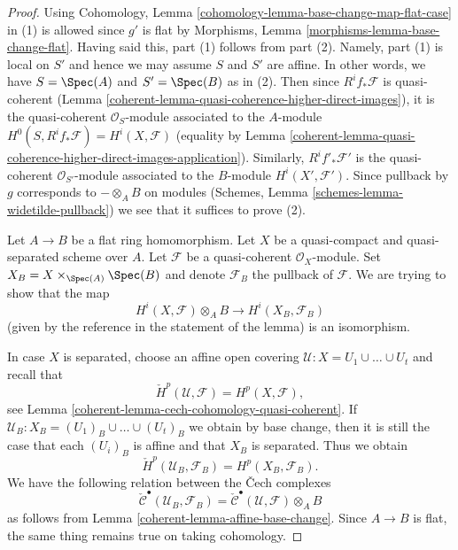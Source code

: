 \begin{proof}

Using Cohomology, Lemma \ref{cohomology-lemma-base-change-map-flat-case} in (1)
is allowed since $g'$ is flat by
Morphisms, Lemma \ref{morphisms-lemma-base-change-flat}.
Having said this, part (1) follows from part (2). Namely,
part (1) is local on $S'$ and hence we may assume $S$
and $S'$ are affine. In other words, we have $S = \Spec(A)$
and $S' = \Spec(B)$ as in (2).
Then since $R^if_*\mathcal{F}$ is quasi-coherent
(Lemma \ref{coherent-lemma-quasi-coherence-higher-direct-images}),
it is the quasi-coherent $\mathcal{O}_S$-module associated to the
$A$-module $H^0(S, R^if_*\mathcal{F}) = H^i(X, \mathcal{F})$
(equality by
Lemma \ref{coherent-lemma-quasi-coherence-higher-direct-images-application}).
Similarly, $R^if'_*\mathcal{F}'$ is the quasi-coherent
$\mathcal{O}_{S'}$-module associated to the $B$-module
$H^i(X', \mathcal{F}')$. Since pullback by $g$ corresponds
to $- \otimes_A B$ on modules
(Schemes, Lemma \ref{schemes-lemma-widetilde-pullback})
we see that it suffices to prove (2).

\medskip\noindent
Let $A \to B$ be a flat ring homomorphism.
Let $X$ be a quasi-compact and quasi-separated scheme over $A$.
Let $\mathcal{F}$ be a quasi-coherent $\mathcal{O}_X$-module.
Set $X_B = X \times_{\Spec(A)} \Spec(B)$ and denote
$\mathcal{F}_B$ the pullback of $\mathcal{F}$.
We are trying to show that the map
$$
H^i(X, \mathcal{F}) \otimes_A B \longrightarrow H^i(X_B, \mathcal{F}_B)
$$
(given by the reference in the statement of the lemma)
is an isomorphism.

\medskip\noindent
In case $X$ is separated, choose an affine open covering
$\mathcal{U} : X = U_1 \cup \ldots \cup U_t$ and recall that
$$
\check{H}^p(\mathcal{U}, \mathcal{F}) = H^p(X, \mathcal{F}),
$$
see
Lemma \ref{coherent-lemma-cech-cohomology-quasi-coherent}.
If $\mathcal{U}_B : X_B = (U_1)_B \cup \ldots \cup (U_t)_B$ we obtain
by base change, then it is still the case that each $(U_i)_B$ is affine
and that $X_B$ is separated. Thus we obtain
$$
\check{H}^p(\mathcal{U}_B, \mathcal{F}_B) = H^p(X_B, \mathcal{F}_B).
$$
We have the following relation between the {\v C}ech complexes
$$
\check{\mathcal{C}}^\bullet(\mathcal{U}_B, \mathcal{F}_B) =
\check{\mathcal{C}}^\bullet(\mathcal{U}, \mathcal{F}) \otimes_A B
$$
as follows from
Lemma \ref{coherent-lemma-affine-base-change}.
Since $A \to B$ is flat, the same thing remains true on taking cohomology.


\end{proof}
